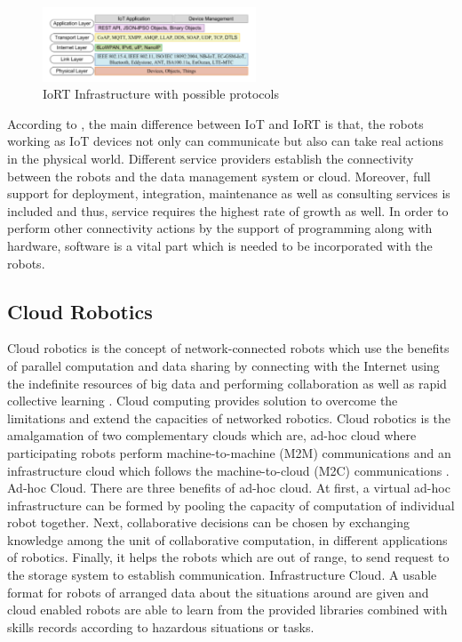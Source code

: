 \documentclass[conference]{IEEEtran}
\begin{document}
 \begin{figure}[ht!] %
 \centering
 \includegraphics[width=2.5in]{Picture2.png}
 \caption{IoRT Infrastructure with possible protocols \cite{nine}}
 \label{iort_possible_protocols}
 \end{figure}

According to \cite{ten}, the main difference between IoT and IoRT is that, the robots working as IoT devices not only can communicate but also can take real actions in the physical world. Different service providers establish the connectivity between the robots and the data management system or cloud. Moreover, full support for deployment, integration, maintenance as well as consulting services is included and thus, service requires the highest rate of growth as well. In order to perform other connectivity actions by the support of programming along with hardware, software is a vital part which is needed to be incorporated with the robots.



\subsection{Cloud Robotics}
Cloud robotics is the concept of network-connected robots which use the benefits of parallel computation and data sharing by connecting with the Internet using the indefinite resources of big data and performing collaboration as well as rapid collective learning \cite{eleven}. Cloud computing provides solution to overcome the limitations and extend the capacities of networked robotics. Cloud robotics is the amalgamation of two complementary clouds which are, ad-hoc cloud where participating robots perform machine-to-machine (M2M) communications and an infrastructure cloud which follows the machine-to-cloud (M2C) communications \cite{two}.
Ad-hoc Cloud. There are three benefits of ad-hoc cloud. At first, a virtual ad-hoc infrastructure can be formed by pooling the capacity of computation of individual robot together. Next, collaborative decisions can be chosen by exchanging knowledge among the unit of collaborative computation, in different applications of robotics. Finally, it helps the robots which are out of range, to send request to the storage system to establish communication. \cite{two}
Infrastructure Cloud. A usable format for robots of arranged data about the situations around are given and cloud enabled robots are able to learn from the provided libraries combined with skills records according to hazardous situations or tasks. \cite{two}
\end{document}
